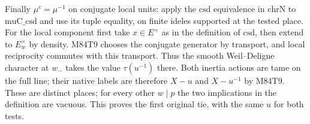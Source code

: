 Finally $\mu^c=\mu^{-1}$ on conjugate local units: apply the
$\mathrm{csd}$ equivalence in $\mathrm{chrN}$ to
$\mathrm{muC\_csd}$ and use its tuple equality, on finite ideles supported at the tested place. For the local
component first take $x\in E^\times$ as in the definition of
$\mathrm{csd}$, then extend to $E_w^\times$ by density.
M84T9 chooses the conjugate generator by transport, and local
reciprocity commutes with this transport. Thus the smooth
Weil--Deligne character at $w_-$ takes the value $\tau(u^{-1})$
there. Both inertia actions are tame on the full line; their native
labels are therefore $X-u$ and $X-u^{-1}$ by M84T9. These are
distinct places; for every other $w\mid p$ the two implications
in the definition are vacuous. This proves the first original
tie, with the same $u$ for both tests.
